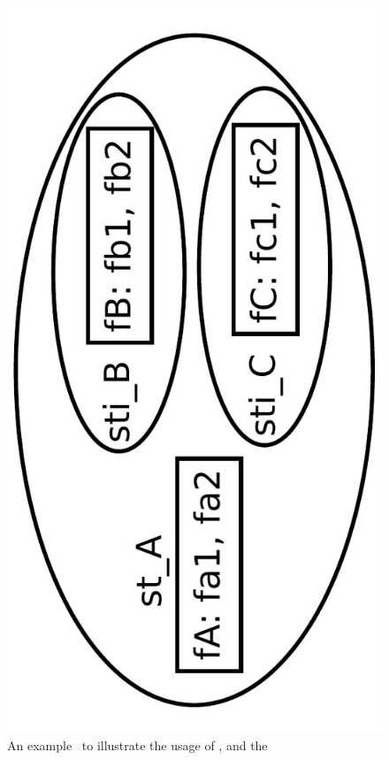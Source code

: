 \begin{figure}[htb]
  \begin{center}
    \includegraphics[scale=0.22]{./figs/diagram_ListOfSpeciesFeatures.pdf}
    \caption{An example \speciesFeatureType\ to illustrate the usage of \ListOfSpeciesFeatures, \SubListOfSpeciesFeatures and the \SpeciesFeature}
  \label{fig:ListOfSpeciesFeaturesExample}
  \end{center}
\end{figure}


